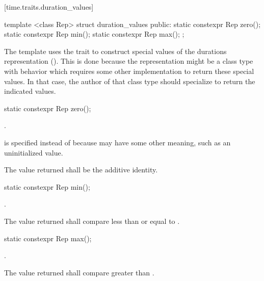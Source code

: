 [time.traits.duration_values]{}

%
\begin{itemdecl}
template <class Rep>
struct duration_values {
public:
  static constexpr Rep zero();
  static constexpr Rep min();
  static constexpr Rep max();
};
\end{itemdecl}

\pnum
The  template uses the  trait to
construct special values of the durations representation (). This is
done because the representation might be a class type with behavior which
requires some other implementation to return these special values. In that case,
the author of that class type should specialize  to
return the indicated values.

%
\begin{itemdecl}
static constexpr Rep zero();
\end{itemdecl}

\begin{itemdescr}
\pnum
\returns {}. \begin{note}  is specified instead of
 because  may have some other meaning, such as an
uninitialized value. \end{note}

\pnum
\remarks The value returned shall be the additive identity.
\end{itemdescr}

%
\begin{itemdecl}
static constexpr Rep min();
\end{itemdecl}

\begin{itemdescr}
\pnum
\returns {}.

\pnum
\remarks The value returned shall compare less than or equal to .
\end{itemdescr}

%
\begin{itemdecl}
static constexpr Rep max();
\end{itemdecl}

\begin{itemdescr}
\pnum
\returns {}.

\pnum
\remarks The value returned shall compare greater than .
\end{itemdescr}


